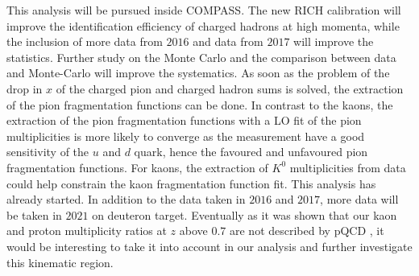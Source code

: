This analysis will be pursued inside COMPASS. The new RICH calibration will improve the identification efficiency of charged hadrons at high momenta, while the inclusion of more data from $2016$ and data from $2017$ will improve the statistics. Further study on the Monte Carlo and the comparison between data and Monte-Carlo will improve the systematics. As soon as the problem of the drop in $x$ of the charged pion and charged hadron sums is solved, the extraction of the pion fragmentation functions can be done. In contrast to the kaons, the extraction of the pion fragmentation functions with a LO fit of the pion multiplicities is more likely to converge as the measurement have a good sensitivity of the $u$ and $d$ quark, hence the favoured and unfavoured pion fragmentation functions. For kaons, the extraction of $K^0$ multiplicities from data could help constrain the kaon fragmentation function fit. This analysis has already started. In addition to the data taken in $2016$ and $2017$, more data will be taken in $2021$ on deuteron target. Eventually as it was shown that our kaon and proton multiplicity ratios at $z$ above $0.7$ are not described by pQCD \cite{MarcinPubli}, it would be interesting to take it into account in our analysis and further investigate this kinematic region.
